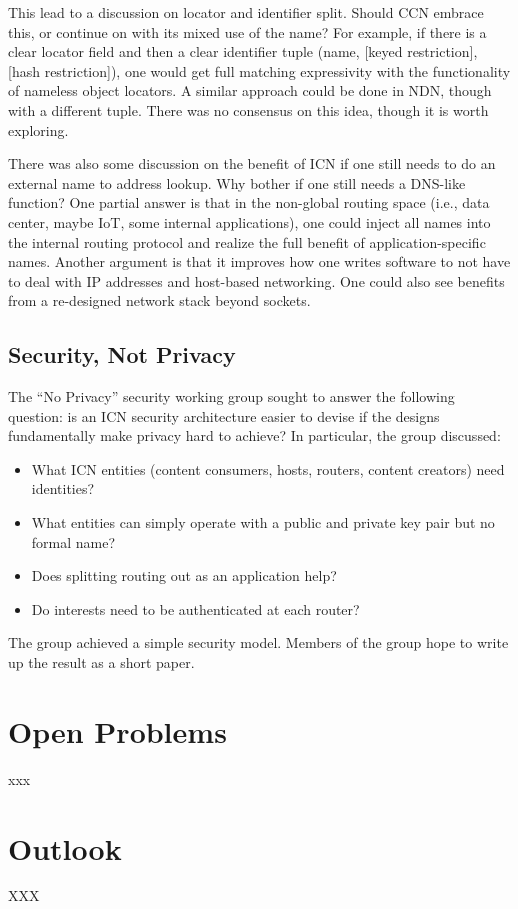 \documentclass{sig-alternate-10pt}
\begin{document}
This lead to a discussion on locator and identifier split.  Should CCN embrace this, or continue on with its mixed use of the name? For example, if there is a clear locator field and then a clear identifier tuple (name, [keyed restriction], [hash restriction]), one would get full matching expressivity with the functionality of nameless object locators.  A similar approach could be done in NDN, though with a different tuple.  There was no consensus on this idea, though it is worth exploring.

There was also some discussion on the benefit of ICN if one still needs to do an external name to address lookup.  Why bother if one still needs a DNS-like function?  One partial answer is that in the non-global routing space (i.e., data center, maybe IoT, some internal applications), one could inject all names into the internal routing protocol and realize the full benefit of application-specific names.  Another argument is that it improves how one writes software to not have to deal with IP addresses and host-based networking. One could also see benefits from a re-designed network stack beyond sockets.

\subsection{Security, Not Privacy}
The ``No Privacy'' security working group sought to answer the following question: is an ICN security architecture easier to devise if the designs fundamentally make privacy hard to achieve? In particular, the group discussed:

\begin{itemize}
\item What ICN entities (content consumers, hosts, routers, content creators) need identities?
\item What entities can simply operate with a public and private key pair but no formal name?
\item Does splitting routing out as an application help?
\item Do interests need to be authenticated at each router?
\end{itemize}

The group achieved a simple security model. Members of the group hope to write up the result as a short paper.


\section{Open Problems}

xxx

\section{Outlook}
XXX

\small


\end{document}
